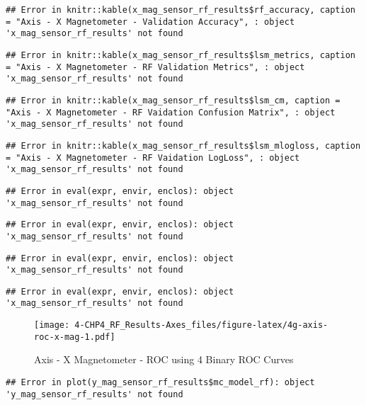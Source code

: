 \documentclass[]{article}
\begin{document}
\begin{verbatim}
## Error in knitr::kable(x_mag_sensor_rf_results$rf_accuracy, caption = "Axis - X Magnetometer - Validation Accuracy", : object 'x_mag_sensor_rf_results' not found
\end{verbatim}

\begin{verbatim}
## Error in knitr::kable(x_mag_sensor_rf_results$lsm_metrics, caption = "Axis - X Magnetometer - RF Validation Metrics", : object 'x_mag_sensor_rf_results' not found
\end{verbatim}

\begin{verbatim}
## Error in knitr::kable(x_mag_sensor_rf_results$lsm_cm, caption = "Axis - X Magnetometer - RF Vaidation Confusion Matrix", : object 'x_mag_sensor_rf_results' not found
\end{verbatim}

\begin{verbatim}
## Error in knitr::kable(x_mag_sensor_rf_results$lsm_mlogloss, caption = "Axis - X Magnetometer - RF Vaidation LogLoss", : object 'x_mag_sensor_rf_results' not found
\end{verbatim}

\begin{verbatim}
## Error in eval(expr, envir, enclos): object 'x_mag_sensor_rf_results' not found
\end{verbatim}

\begin{verbatim}
## Error in eval(expr, envir, enclos): object 'x_mag_sensor_rf_results' not found
\end{verbatim}

\begin{verbatim}
## Error in eval(expr, envir, enclos): object 'x_mag_sensor_rf_results' not found
\end{verbatim}

\begin{verbatim}
## Error in eval(expr, envir, enclos): object 'x_mag_sensor_rf_results' not found
\end{verbatim}

\begin{figure}
\centering
\texttt{[image: 4-CHP4\_RF\_Results-Axes\_files/figure-latex/4g-axis-roc-x-mag-1.pdf]}
\caption{Axis - X Magnetometer - ROC using 4 Binary ROC Curves}
\end{figure}

\begin{verbatim}
## Error in plot(y_mag_sensor_rf_results$mc_model_rf): object 'y_mag_sensor_rf_results' not found
\end{verbatim}
\end{document}
